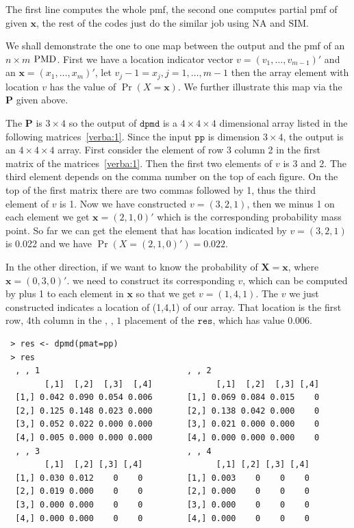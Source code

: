 \documentclass[12pt]{article}
\newcommand{\Pmat}{\mathbf{P}}
\newcommand{\PMD}{{\normalfont\textrm{PMD}}}
\newcommand{\Xvec}{\boldsymbol{X}}
\newcommand{\xvec}{\boldsymbol{x}}
\newcommand{\code}{\texttt}
\newcommand{\SIM}{{\textrm{SIM}}}
\newcommand{\NA}{{\textrm{NA}}}
\begin{document}
The first line computes the whole pmf, the second one computes partial pmf of given $\xvec$, the rest of the codes just do the similar job using $\NA$ and $\SIM$.

We shall demonstrate the one to one map between the output and the pmf of an $n \times m$ $\PMD$. First we have a location indicator vector $v = (v_1, \dots, v_{m-1})'$ and an $\xvec=(x_1,\dots,x_m)'$, let $v_j-1 = x_j, j =1,\dots,m-1$ then the array element with location $v$ has the value of $\Pr(X=\xvec)$. We further illustrate this map via the $\Pmat$ given above.

The $\Pmat$ is $3 \times 4$ so the output of $\code{dpmd}$ is a $4 \times 4 \times 4$ dimensional array listed in the following matrices~\ref{verba:1}. Since the input $\code{pp}$ is dimension $3 \times 4$, the output is an $4 \times 4 \times 4$ array. First consider the element of row 3 column 2 in the first matrix of the matrices~\ref{verba:1}. Then the first two elements of $v$ is 3 and 2. The third element depends on the comma number on the top of each figure. On the top of the first matrix there are two commas followed by 1, thus the third element of $v$ is 1. Now we have constructed $v = (3,2,1)$, then we minus 1 on each element we get $\xvec=(2,1,0)'$ which is the corresponding probability mass point. So far we can get the element that has location indicated by $v=(3,2,1)$ is 0.022 and we have $\Pr(X=(2,1,0)')=0.022$.

In the other direction, if we want to know the probability of $\Xvec=\xvec$, where $\xvec=(0,3,0)'$. we need to construct its corresponding $v$, which can be computed by plus 1 to each element in $\xvec$ so that we get $v=(1,4,1)$. The $v$ we just constructed indicates a location of (1,4,1) of our array. That location is the first row, 4th column in the $\text{, , 1}$ placement of the $\code{res}$, which has value 0.006.

\begin{verbatim}
 > res <- dpmd(pmat=pp)
 > res
  , , 1                              , , 2
        [,1]  [,2]  [,3]  [,4]             [,1]  [,2]  [,3] [,4]
  [1,] 0.042 0.090 0.054 0.006       [1,] 0.069 0.084 0.015    0
  [2,] 0.125 0.148 0.023 0.000       [2,] 0.138 0.042 0.000    0
  [3,] 0.052 0.022 0.000 0.000       [3,] 0.021 0.000 0.000    0
  [4,] 0.005 0.000 0.000 0.000       [4,] 0.000 0.000 0.000    0
  , , 3                              , , 4
        [,1]  [,2] [,3] [,4]               [,1] [,2] [,3] [,4]
  [1,] 0.030 0.012    0    0         [1,] 0.003    0    0    0
  [2,] 0.019 0.000    0    0         [2,] 0.000    0    0    0
  [3,] 0.000 0.000    0    0         [3,] 0.000    0    0    0
  [4,] 0.000 0.000    0    0         [4,] 0.000    0    0    0
\end{verbatim}
\label{verba:1}
\end{document}
